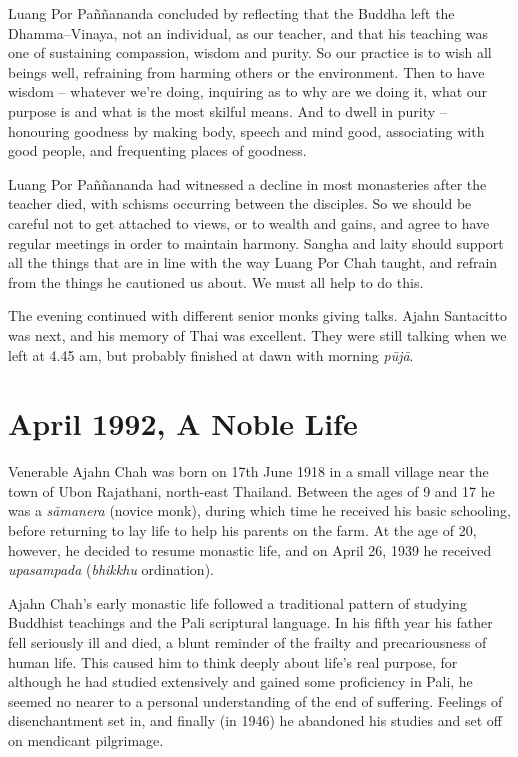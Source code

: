 Luang Por Paññananda concluded by reflecting that the Buddha left the
Dhamma--Vinaya, not an individual, as our teacher, and that his teaching
was one of sustaining compassion, wisdom and purity. So our practice is
to wish all beings well, refraining from harming others or the
environment. Then to have wisdom -- whatever we're doing, inquiring as
to why are we doing it, what our purpose is and what is the most skilful
means. And to dwell in purity -- honouring goodness by making body,
speech and mind good, associating with good people, and frequenting
places of goodness.

Luang Por Paññananda had witnessed a decline in most monasteries after
the teacher died, with schisms occurring between the disciples. So we
should be careful not to get attached to views, or to wealth and gains,
and agree to have regular meetings in order to maintain harmony. Sangha
and laity should support all the things that are in line with the way
Luang Por Chah taught, and refrain from the things he cautioned us
about. We must all help to do this.

The evening continued with different senior monks giving talks. Ajahn
Santacitto was next, and his memory of Thai was excellent. They were
still talking when we left at 4.45 am, but probably finished at dawn
with morning \emph{pūjā}.

\chapter{April 1992, A Noble Life}

Venerable Ajahn Chah was born on 17th June 1918 in a small village near
the town of Ubon Rajathani, north-east Thailand. Between the ages of 9
and 17 he was a \emph{sāmanera} (novice monk), during which time he
received his basic schooling, before returning to lay life to help his
parents on the farm. At the age of 20, however, he decided to resume
monastic life, and on April 26, 1939 he received \emph{upasampada}
(\emph{bhikkhu} ordination).

Ajahn Chah's early monastic life followed a traditional pattern of
studying Buddhist teachings and the Pali scriptural language. In his
fifth year his father fell seriously ill and died, a blunt reminder of
the frailty and precariousness of human life. This caused him to think
deeply about life's real purpose, for although he had studied
extensively and gained some proficiency in Pali, he seemed no nearer to
a personal understanding of the end of suffering. Feelings of
disenchantment set in, and finally (in 1946) he abandoned his studies
and set off on mendicant pilgrimage.

